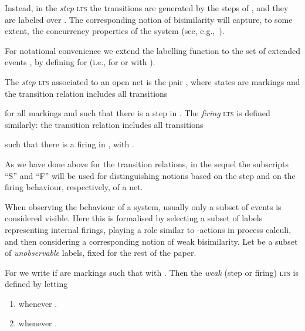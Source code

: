 \documentclass{LMCS}
\begin{document}
Instead, in the \emph{step} \textsc{lts} the transitions are generated by
the steps of , and they are labeled over   .
The
corresponding notion of bisimilarity will capture, to some extent, the
concurrency properties of the system (see,
e.g.,~\cite{Vog:BAR,NT:DNDC}).











For notational convenience we extend the labelling function
 to the set of extended events , by defining
 for  (i.e., for  or
 with ).

\begin{defi}
  The \emph{step} \textsc{lts} associated to an open net  is the
  pair , where states are
  markings  and the transition relation
   includes all transitions
  
  for all markings  and  such that there is a step  in
  .
The \emph{firing} \textsc{lts}  is defined 
  similarly: the transition  relation
   includes all transitions
  
  such that there is a firing  in
  , with .
\end{defi}

As we have done above for the transition relations, in the sequel the
subscripts ``\textsf{S}'' and ``\textsf{F}'' will be used for distinguishing
notions based on the step and on the firing behaviour,
respectively, of a net.

When observing the behaviour of a system, usually only a subset of
events is considered visible.  Here this is formalised by selecting
a subset of labels representing internal firings, playing a role
similar to -actions in process calculi, and then considering a
corresponding notion of weak bisimilarity.
Let  be a subset of
\emph{unobservable} labels, fixed for the rest of the paper.

\begin{defi}
  For  we write  if  are markings such
  that  with .
Then the \emph{weak} (step or firing) \textsc{lts} is defined by
  letting

  \begin{enumerate}[]
    
  \item  whenever .
    


  \item  whenever  \qquad .
    
  \end{enumerate}
\end{defi}
\end{document}
